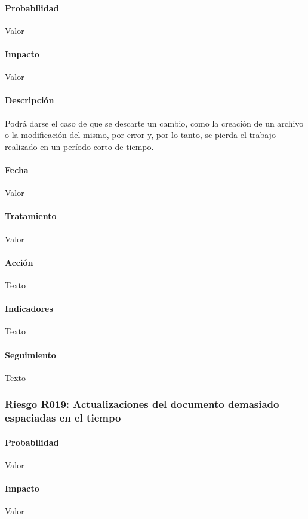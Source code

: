 \documentclass[10pt,a4paper]{article}
\begin{document}
				\paragraph{Probabilidad} Valor
				\paragraph{Impacto}	Valor
				\paragraph{Descripción} Podrá darse el caso de que se descarte un cambio, como la creación de un archivo o la modificación del mismo, por error y, por lo tanto, se pierda el trabajo realizado en un período corto de tiempo.
				\paragraph{Fecha} Valor %
				\paragraph{Tratamiento} Valor %
				\paragraph{Acción} Texto %
				\paragraph{Indicadores} Texto %
				\paragraph{Seguimiento}	Texto %
				\subsubsection{Riesgo R019: Actualizaciones del documento demasiado espaciadas en el tiempo}
				\paragraph{Probabilidad} Valor
				\paragraph{Impacto}	Valor
\end{document}
